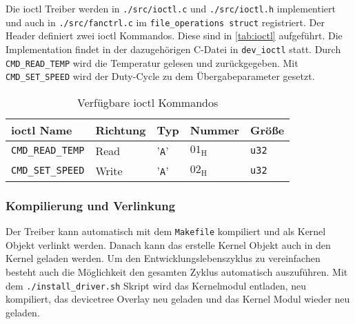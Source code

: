 Die \gls{ioctl} Treiber werden in \texttt{./src/ioctl.c} und \texttt{./src/ioctl.h} implementiert und auch in \texttt{./src/fanctrl.c} im \texttt{file\_operations struct} registriert.
Der Header definiert zwei \gls{ioctl} Kommandos.
Diese sind in \autoref{tab:ioctl} aufgeführt.
Die Implementation findet in der dazugehörigen C-Datei in \texttt{dev\_ioctl} statt.
Durch \texttt{CMD\_READ\_TEMP} wird die Temperatur gelesen und zurückgegeben.
Mit \texttt{CMD\_SET\_SPEED} wird der Duty-Cycle zu dem Übergabeparameter gesetzt.

\begin{table}[h]
    \centering
    \begin{tabular}{|l|l|l|l|l|}
        \hline
        \textbf{\gls{ioctl} Name} & \textbf{Richtung} & \textbf{Typ} & \textbf{Nummer} & \textbf{Größe} \\
        \hline
        \hline
        \texttt{CMD\_READ\_TEMP} & Read & '\texttt{A}' & $01_{\text{H}}$ & \texttt{u32} \\
        \hline
        \texttt{CMD\_SET\_SPEED} & Write & '\texttt{A}' & $02_{\text{H}}$ & \texttt{u32} \\
        \hline
    \end{tabular}
    \caption{Verfügbare \acrshort{ioctl} Kommandos}
    \label{tab:ioctl}
\end{table}

\subsubsection{Kompilierung und Verlinkung}

Der Treiber kann automatisch mit dem \texttt{Makefile} kompiliert und als Kernel Objekt verlinkt werden.
Danach kann das erstelle Kernel Objekt auch in den Kernel geladen werden.
Um den Entwicklungslebenszyklus zu vereinfachen besteht auch die Möglichkeit den gesamten Zyklus automatisch auszuführen.
Mit dem \texttt{./install\_driver.sh} Skript wird das Kernelmodul entladen, neu kompiliert, das \gls{devicetree} Overlay neu geladen und das Kernel Modul wieder neu geladen.
